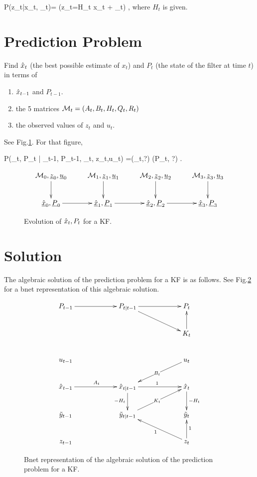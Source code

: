 \beq\color{blue}
P(z_t|x_t, \zeta_t)=
\indi(z_t=H_t x_t +  \zeta_t)
\;,
\eeq
where $H_t$ is given.


\section{Prediction
Problem}
Find ${\hat{x}}_t$ (the 
best possible estimate
of $x_t$)
and $P_t$ (the state of the 
filter at time $t$)
in terms of 
\begin{enumerate}
\item
${\hat{x}}_{t-1}$
and $P_{t-1}$.
\item
 the 5 matrices
${\cal M}_t=(A_t,B_t,H_t,Q_t,R_t)$
\item
the observed  values of 
$z_t$ and $u_t$.

\end{enumerate}
See Fig.\ref{fig-kal-evol}.
For that figure,

\beq \color{blue}
P(\hatx_t, P_t | 
\hatx_{t-1}, P_{t-1},
\calm_t,
z_t,u_t)
=\delta(\hatx_t,?)
\delta(P_t, ?)
\;.
\eeq

\begin{figure}[h!]
\centering
$$\xymatrix{
\calm_0, \rvz_0,\rvu_0\ar[d]&
\calm_1, \rvz_1,\rvu_1\ar[d]&
\calm_2, \rvz_2,\rvu_2\ar[d]&
\calm_3, \rvz_3,\rvu_3\ar[d]
\\
\ul{\hatx}_0, 
\ul{P}_0\ar[r]&
\ul{\hatx}_1, 
\ul{P}_1\ar[r]&
\ul{\hatx}_2, 
\ul{P}_2\ar[r]&
\ul{\hatx}_3, 
\ul{P}_3
}$$
\caption{Evolution of
${\hat{x}}_t, P_t$ for a KF.}
\label{fig-kal-evol}
\end{figure}

\section{
Solution} 

The algebraic solution
of
the prediction problem
for a KF 
is as follows.
See Fig.\ref{fig-kal-evol-plus}
for a bnet representation
of this algebraic
solution.

\begin{figure}[h!]
$$
\xymatrix@C=5pc{
P_{t-1}\ar[r]
&P_{t|t-1}\ar[r]\ar[rd]
&P_t
\\
&&
K_t\ar[u]
\\
u_{t-1}
&
&u_t\ar[ld]|{B_t}
\\
\hatx_{t-1}\ar[r]^{A_t}
&\hatx_{t|t-1}\ar[r]^1
\ar[d]_{-H_t}
&\hatx_t\ar[d]^{-H_t}
\\
\tilde{y}_{t-1}
&\tilde{y}_{t|t-1}\ar[ru]|{K_t}
&\tilde{y}_t
\\
z_{t-1}
&
&z_t\ar[lu]^1
\ar[u]_1
}
$$
\caption{Bnet representation
of the algebraic
solution of
the prediction 
problem for a KF.}
\label{fig-kal-evol-plus}
\end{figure}


